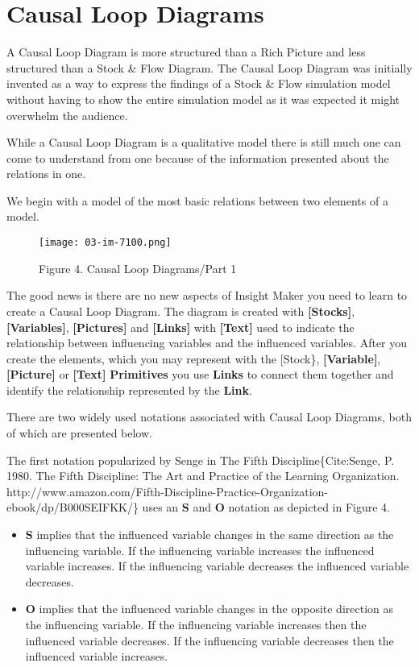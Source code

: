 \documentclass[]{memoir}
\let\Oldincludegraphics\includegraphics
\renewcommand{\includegraphics}[1]{\Oldincludegraphics[max size={\textwidth}{\textheight}]{#1}}
\newcommand{\p}[1]{\textbf{{[}#1{]}}}
\renewcommand{\u}[1]{\textbf{#1}}
\begin{document}
\section{Causal Loop Diagrams}

A Causal Loop Diagram is more structured than a Rich Picture and less
structured than a Stock \& Flow Diagram. The Causal Loop Diagram was
initially invented as a way to express the findings of a Stock \& Flow
simulation model without having to show the entire simulation model as
it was expected it might overwhelm the audience.

While a Causal Loop Diagram is a qualitative model there is still much
one can come to understand from one because of the information presented
about the relations in one.

We begin with a model of the most basic relations between two elements
of a model.

\begin{figure}[htbp]
\centering
\texttt{[image: 03-im-7100.png]}
\caption{Figure 4. Causal Loop Diagrams/Part 1}
\end{figure}

The good news is there are no new aspects of Insight Maker you need to
learn to create a Causal Loop Diagram. The diagram is created with
\p{Stocks}, \p{Variables}, \p{Pictures} and \p{Links} with \p{Text} used
to indicate the relationship between influencing variables and the
influenced variables. After you create the elements, which you may
represent with the {[}Stock\}, \p{Variable}, \p{Picture} or \p{Text}
\u{Primitives} you use \u{Links} to connect them together and identify
the relationship represented by the \u{Link}.

There are two widely used notations associated with Causal Loop
Diagrams, both of which are presented below.

The first notation popularized by Senge in The Fifth
Discipline\{Cite:Senge, P. 1980. The Fifth Discipline: The Art and
Practice of the Learning Organization.
http://www.amazon.com/Fifth-Discipline-Practice-Organization-ebook/dp/B000SEIFKK/\}
uses an \textbf{S} and \textbf{O} notation as depicted in Figure 4.

\begin{itemize}
\itemsep1pt\parskip0pt
\item
  \textbf{S} implies that the influenced variable changes in the same
  direction as the influencing variable. If the influencing variable
  increases the influenced variable increases. If the influencing
  variable decreases the influenced variable decreases.
\item
  \textbf{O} implies that the influenced variable changes in the
  opposite direction as the influencing variable. If the influencing
  variable increases then the influenced variable decreases. If the
  influencing variable decreases then the influenced variable increases.
\end{itemize}
\end{document}
